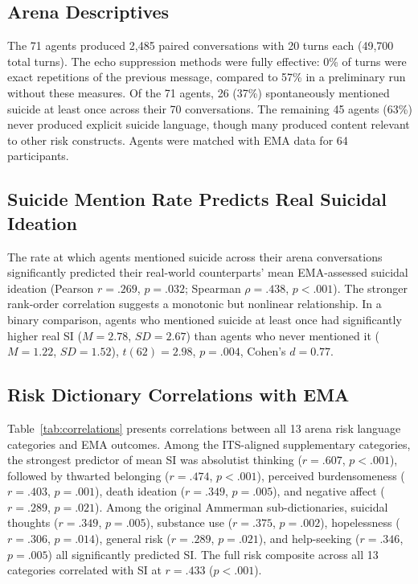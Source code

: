 \documentclass[review,12pt,authoryear]{elsarticle}
\begin{document}
\subsection{Arena Descriptives}

The 71 agents produced 2,485 paired conversations with 20 turns each (49,700 total turns). The echo suppression methods were fully effective: 0\% of turns were exact repetitions of the previous message, compared to 57\% in a preliminary run without these measures. Of the 71 agents, 26 (37\%) spontaneously mentioned suicide at least once across their 70 conversations. The remaining 45 agents (63\%) never produced explicit suicide language, though many produced content relevant to other risk constructs. Agents were matched with EMA data for 64 participants.

\subsection{Suicide Mention Rate Predicts Real Suicidal Ideation}

The rate at which agents mentioned suicide across their arena conversations significantly predicted their real-world counterparts' mean EMA-assessed suicidal ideation (Pearson $r = .269$, $p = .032$; Spearman $\rho = .438$, $p < .001$). The stronger rank-order correlation suggests a monotonic but nonlinear relationship. In a binary comparison, agents who mentioned suicide at least once had significantly higher real SI ($M = 2.78$, $SD = 2.67$) than agents who never mentioned it ($M = 1.22$, $SD = 1.52$), $t(62) = 2.98$, $p = .004$, Cohen's $d = 0.77$.

\subsection{Risk Dictionary Correlations with EMA}

Table~\ref{tab:correlations} presents correlations between all 13 arena risk language categories and EMA outcomes. Among the ITS-aligned supplementary categories, the strongest predictor of mean SI was absolutist thinking ($r = .607$, $p < .001$), followed by thwarted belonging ($r = .474$, $p < .001$), perceived burdensomeness ($r = .403$, $p = .001$), death ideation ($r = .349$, $p = .005$), and negative affect ($r = .289$, $p = .021$). Among the original Ammerman sub-dictionaries, suicidal thoughts ($r = .349$, $p = .005$), substance use ($r = .375$, $p = .002$), hopelessness ($r = .306$, $p = .014$), general risk ($r = .289$, $p = .021$), and help-seeking ($r = .346$, $p = .005$) all significantly predicted SI. The full risk composite across all 13 categories correlated with SI at $r = .433$ ($p < .001$).
\end{document}
